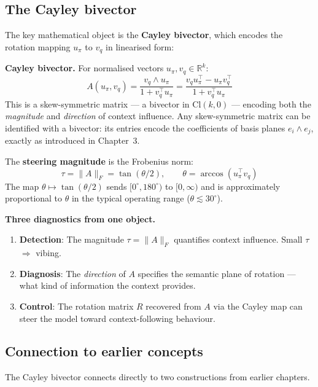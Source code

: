 \documentclass[11pt, twoside, openright]{memoir}
\newcommand{\op}{\wedge}          %
\begin{document}
\subsection{The Cayley bivector}

The key mathematical object is the \textbf{Cayley bivector}, which
encodes the rotation mapping $u_\pi$ to $v_q$ in linearised form:

\begin{gabox}
\textbf{Cayley bivector.}
For normalised vectors $u_\pi, v_q \in \mathbb{R}^k$:
\[
  A(u_\pi, v_q) = \frac{v_q \op u_\pi}{1 + v_q^\top u_\pi}
  = \frac{v_q u_\pi^\top - u_\pi v_q^\top}{1 + v_q^\top u_\pi}
\]
This is a skew-symmetric matrix --- a bivector in $\mathrm{Cl}(k, 0)$
--- encoding both the \emph{magnitude} and \emph{direction} of context
influence.
Any skew-symmetric matrix can be identified with a bivector: its entries encode the coefficients of basis planes $e_i \wedge e_j$, exactly as introduced in Chapter~3.
\end{gabox}

The \textbf{steering magnitude} is the Frobenius norm:
\[
  \tau = \|A\|_F = \tan(\theta/2), \qquad
  \theta = \arccos(u_\pi^\top v_q)
\]
The map $\theta \mapsto \tan(\theta/2)$ sends
$[0^\circ, 180^\circ)$ to $[0, \infty)$ and is approximately
proportional to $\theta$ in the typical operating range
($\theta \lesssim 30^\circ$).

\begin{keyidea}
\textbf{Three diagnostics from one object.}
\begin{enumerate}[nosep]
\item \textbf{Detection}: The magnitude
  $\tau = \|A\|_F$ quantifies context influence.
  Small $\tau$ $\Rightarrow$ vibing.
\item \textbf{Diagnosis}: The \emph{direction} of $A$
  specifies the semantic plane of rotation --- what kind of
  information the context provides.
\item \textbf{Control}: The rotation matrix $R$ recovered from
  $A$ via the Cayley map can steer the model toward
  context-following behaviour.
\end{enumerate}
\end{keyidea}

\subsection{Connection to earlier concepts}

The Cayley bivector connects directly to two constructions from
earlier chapters.
\end{document}
